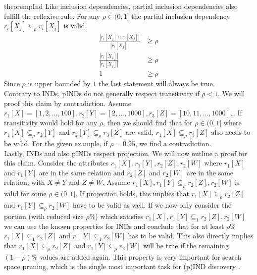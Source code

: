 \begin{restatable}{theorem}{pInd}\label{theo:pInd}
    Like inclusion dependencies, partial inclusion dependencies also fulfill the reflexive rule. For any $\rho \in (0, 1]$ the partial inclusion dependency $r_i[X_j] \subseteq_{\rho} r_i[X_j]$ is valid.
    \begin{align*}
        \frac{|r_i[X_j] \cap r_i[X_j]|}
            {|r_i[X_j]|} & \geq \rho \\
        \frac{|r_i[X_j]|}
            {|r_i[X_j]|} & \geq \rho \\
            1 & \geq \rho
     \end{align*}
     Since $\rho$ is upper bounded by $1$ the last statement will always be true. \\

     \noindent Contrary to INDs, pINDs do not generally respect transitivity if $\rho < 1$. We will proof this claim by contradiction. Assume $r_1[X] = [1, 2, ..., 100], r_2[Y] = [2, ..., 1000], r_3[Z] = [10, 11, ..., 1000],$. If transitivity would hold for any $\rho$, then we should find that for $\rho \in (0, 1]$ where $r_1[X] \subseteq_\rho r_2[Y]$ and $ r_2[Y] \subseteq_\rho  r_3[Z]$ are valid, $ r_1[X] \subseteq_\rho  r_3[Z]$ also needs to be valid. For the given example, if $\rho = 0.95$, we find a contradiction. \\

     \noindent Lastly, INDs and also pINDs respect projection. We will now outline a proof for this claim. Consider the attributes $r_1[X], r_1[Y], r_2[Z], r_2[W]$ where $r_1[X]$ and $r_1[Y]$ are in the same relation and $r_2[Z]$ and $r_2[W]$ are in the same relation, with $X \not = Y$ and $Z \not = W$. Assume $r_1[X], r_1[Y] \subseteq_\rho r_2[Z], r_2[W]$ is valid for some $\rho \in (0, 1]$. If projection holds, this implies that $r_1[X] \subseteq_\rho r_2[Z]$ and $r_1[Y] \subseteq_\rho r_2[W]$ have to be valid as well. If we now only consider the portion (with reduced size $\rho\%$) which satisfies $r_1[X], r_1[Y] \subseteq_1 r_2[Z], r_2[W]$ we can use the known properties for INDs and conclude that for at least $\rho\%$ $r_1[X] \subseteq_1 r_2[Z]$ and $r_1[Y] \subseteq_1 r_2[W]$ has to be valid. This also directly implies that $r_1[X] \subseteq_\rho r_2[Z]$ and $r_1[Y] \subseteq_\rho r_2 [W]$ will be true if the remaining $(1-\rho)\%$ values are added again. This property is very important for search space pruning, which is the single most important task for (p)IND discovery \cite{liu2010discover}.
\end{restatable}

